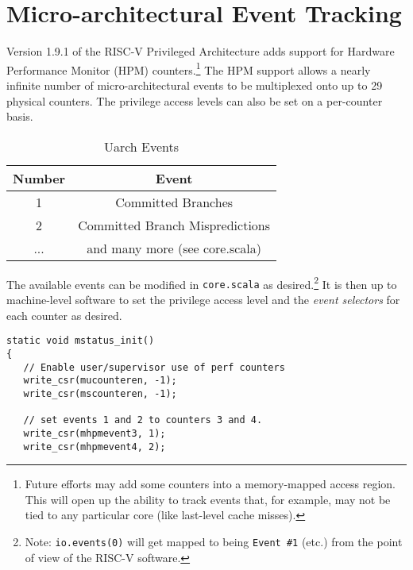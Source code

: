 \chapter{Micro-architectural Event Tracking}

Version 1.9.1 of the RISC-V Privileged Architecture adds support for Hardware Performance Monitor (HPM) counters.\footnote{Future efforts may add some counters into a memory-mapped access region. This will open up the ability to track events that, for example, may not be tied to any particular core (like last-level cache misses).}  The HPM support allows a nearly infinite number of micro-architectural events to be multiplexed onto up to 29 physical counters.  The privilege access levels can also be set on a per-counter basis.

\begin{table}[htp]
\caption{Uarch Events}
\begin{center}
\begin{tabular}{|c|c|}
\hline
Number & Event \\
\hline
\hline
1 & Committed Branches  \\
\hline
2 & Committed Branch Mispredictions\\
\hline
... & and many more (see core.scala) \\
\hline
\end{tabular}
\end{center}
\label{table:uarchcounters}
\end{table}%

The available events can be modified in {\tt core.scala} as desired.\footnote{Note: {\tt io.events(0)} will get mapped to being {\tt Event \#1} (etc.) from the point of view of the RISC-V software.}  It is then up to machine-level software to set the privilege access level and the {\em event selectors} for each counter as desired.

\begin{center}
\begin{minipage}{0.66\textwidth}
\begin{lstlisting}[caption=Setting the privilege level and event selectors for the HPM counters.]
static void mstatus_init()
{
   // Enable user/supervisor use of perf counters
   write_csr(mucounteren, -1);
   write_csr(mscounteren, -1);

   // set events 1 and 2 to counters 3 and 4.
   write_csr(mhpmevent3, 1);
   write_csr(mhpmevent4, 2);
\end{lstlisting}\label{ref:code_hpm_init}
\end{minipage}
\end{center}


